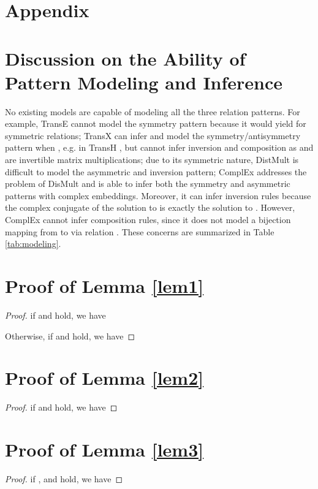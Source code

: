 \documentclass{article} \usepackage{iclr2019_conference,times}
\begin{document}



\newpage
\appendix

\section*{Appendix}

\section{Discussion on the Ability of Pattern Modeling and Inference} \label{sec:dis}
No existing models are capable of modeling all the three relation patterns. For example, TransE cannot model the symmetry pattern because it would yield  for symmetric relations; TransX can infer and model the symmetry/antisymmetry pattern when , e.g. in TransH  \citep{wang2014knowledge}, but cannot infer inversion and composition as  and  are invertible matrix multiplications; due to its symmetric nature, DistMult is difficult to model the asymmetric and inversion pattern; ComplEx addresses the problem of DisMult and is able to infer both the symmetry and asymmetric patterns with complex embeddings. Moreover, it can infer inversion rules because the complex conjugate of the solution to  is exactly the solution to . However, ComplEx cannot infer composition rules, since it does not model a bijection mapping from  to  via relation . These concerns are summarized in Table \ref{tab:modeling}.

\section{Proof of Lemma \ref{lem1}} \label{sec:lem1}
\begin{proof}
if  and  hold, we have

Otherwise, if  and  hold, we have

\end{proof}
\section{Proof of Lemma \ref{lem2}} \label{sec:lem2}
\begin{proof}
if  and  hold, we have

\end{proof}
\section{Proof of Lemma \ref{lem3}} \label{sec:lem3}
\begin{proof}
if ,  and  hold, we have

\end{proof}
\end{document}
